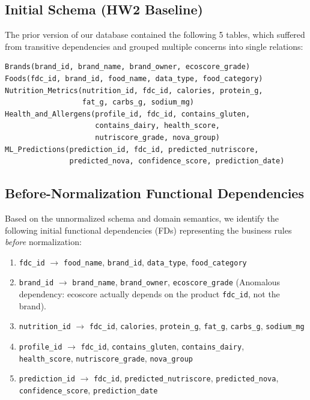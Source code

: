 \documentclass[12pt,a4paper]{article}
\begin{document}
\subsection{Initial Schema (HW2 Baseline)}
The prior version of our database contained the following 5 tables, which suffered from transitive dependencies and grouped multiple concerns into single relations:

\begin{sqlbox}
\small
\begin{verbatim}
Brands(brand_id, brand_name, brand_owner, ecoscore_grade)
Foods(fdc_id, brand_id, food_name, data_type, food_category)
Nutrition_Metrics(nutrition_id, fdc_id, calories, protein_g,
                  fat_g, carbs_g, sodium_mg)
Health_and_Allergens(profile_id, fdc_id, contains_gluten,
                     contains_dairy, health_score,
                     nutriscore_grade, nova_group)
ML_Predictions(prediction_id, fdc_id, predicted_nutriscore,
               predicted_nova, confidence_score, prediction_date)
\end{verbatim}
\end{sqlbox}

\subsection{Before-Normalization Functional Dependencies}
Based on the unnormalized schema and domain semantics, we identify the following initial functional dependencies (FDs) representing the business rules \emph{before} normalization:

\begin{fdbox}
\begin{enumerate}[label=\textbf{FD\arabic*:}]
    \item \texttt{fdc\_id} $\to$ \texttt{food\_name}, \texttt{brand\_id}, \texttt{data\_type}, \texttt{food\_category}
    \item \texttt{brand\_id} $\to$ \texttt{brand\_name}, \texttt{brand\_owner}, \texttt{ecoscore\_grade} (Anomalous dependency: ecoscore actually depends on the product \texttt{fdc\_id}, not the brand).
    \item \texttt{nutrition\_id} $\to$ \texttt{fdc\_id}, \texttt{calories}, \texttt{protein\_g}, \texttt{fat\_g}, \texttt{carbs\_g}, \texttt{sodium\_mg}
    \item \texttt{profile\_id} $\to$ \texttt{fdc\_id}, \texttt{contains\_gluten}, \texttt{contains\_dairy}, \\ \texttt{health\_score}, \texttt{nutriscore\_grade}, \texttt{nova\_group}
    \item \texttt{prediction\_id} $\to$ \texttt{fdc\_id}, \texttt{predicted\_nutriscore}, \texttt{predicted\_nova}, \\ \texttt{confidence\_score}, \texttt{prediction\_date}
\end{enumerate}
\end{fdbox}
\end{document}
